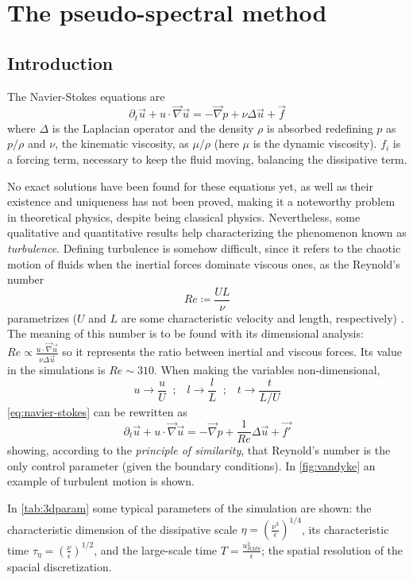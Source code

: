 \section[Pseudo-spectral]{The pseudo-spectral method} \label{sec:pseudospectral}

\subsection{Introduction} \label{sec:lag_intro}
The Navier-Stokes equations are 
\begin{equation} \label{eq:navier-stokes}
  \partial_t \vec{u} + u\cdot\vec{\nabla} \vec{u} = -\vec{\nabla} p +\nu \Delta \vec{u} + \vec{f}
\end{equation}
where $\Delta$ is the Laplacian operator and the density $\rho$ is absorbed redefining $p$ as $p/\rho$ and $\nu$, the kinematic viscosity, as $\mu/\rho$ (here $\mu$ is the dynamic viscosity). $f_i$ is a forcing term, necessary to keep the fluid moving, balancing the dissipative term.

No exact solutions have been found for these equations yet, as well as their existence and uniqueness has not been proved, making it a noteworthy problem in theoretical physics, despite being classical physics. Nevertheless, some qualitative and quantitative results help characterizing the phenomenon known as \textit{turbulence}. Defining turbulence is somehow difficult, since it refers to the chaotic motion of fluids when the inertial forces dominate viscous ones, as the Reynold's number 
\[ Re \coloneqq \frac{UL}{\nu} \]
parametrizes ($U$ and $L$ are some characteristic velocity and length, respectively) \autocite{frisch}. The meaning of this number is to be found with its dimensional analysis: \( Re \propto \frac{u\cdot\vec{\nabla} \vec{u}}{\nu \Delta \vec{u}} \) so it represents the ratio between inertial and viscous forces. Its value in the simulations is \(Re \sim 310\). When making the variables non-dimensional,
\[ u \rightarrow \frac{u}{U} \;\;;\;\;\; l \rightarrow \frac{l}{L} \;\;;\;\;\; t \rightarrow \frac{t}{L/U} \]
\autoref{eq:navier-stokes} can be rewritten as
\[   \partial_t \vec{u} + u\cdot\vec{\nabla} \vec{u} = -\vec{\nabla} p + \frac{1}{Re} \Delta \vec{u} + \vec{f'} \]
showing, according to the \textit{principle of similarity}, that Reynold's number is the only control parameter (given the boundary conditions). In \autoref{fig:vandyke} an example of turbulent motion is shown. 

In \autoref{tab:3dparam} some typical parameters of the simulation are shown: the characteristic dimension of the dissipative scale \(\eta = \left(\frac{\nu^3}{\epsilon}\right)^{1/4}\), its characteristic time \( \tau_\eta = \left(\frac{\nu}{\epsilon}\right)^{1/2}\), and the large-scale time \( T = \frac{u_{RMS}^2}{\epsilon} \); the spatial resolution of the spacial discretization.

